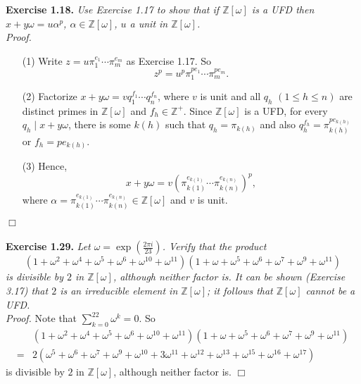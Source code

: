 \documentclass{article}
\begin{document}



\textbf{Exercise 1.18.}
\emph{Use Exercise 1.17 to show that if $\mathbb{Z}[\omega]$ is a UFD then
$x+y\omega = u\alpha^p$, $\alpha \in \mathbb{Z}[\omega]$,
$u$ a unit in $\mathbb{Z}[\omega]$. } \\

\emph{Proof.}
\begin{enumerate}
\item[(1)]
Write $z = u {\pi}_1^{e_1} \cdots {\pi}_m^{e_m}$ as Exercise 1.17.
So
$$z^p = u^p {\pi}_1^{pe_1} \cdots {\pi}_m^{pe_m}.$$
\item[(2)]
Factorize $x + y\omega = v q_1^{f_1} \cdots q_n^{f_n}$,
where $v$ is unit and all $q_h$ $(1 \leq h \leq n)$ are distinct primes in $\mathbb{Z}[\omega]$
and $f_h \in \mathbb{Z}^+$.
Since $\mathbb{Z}[\omega]$ is a UFD,
for every $q_h \mid x + y\omega$, there is some $k(h)$ such that $q_h = \pi_{k(h)}$
and also $q_h^{f_h} = \pi_{k(h)}^{pe_{k(h)}}$ or $f_h = pe_{k(h)}$.
\item[(3)]
Hence,
$$x + y\omega = v \left( \pi_{k(1)}^{e_{k(1)}} \cdots \pi_{k(n)}^{e_{k(n)}} \right)^p,$$
where $\alpha = \pi_{k(1)}^{e_{k(1)}} \cdots \pi_{k(n)}^{e_{k(n)}} \in \mathbb{Z}[\omega]$
and $v$ is unit.
\end{enumerate}
$\Box$ \\\\






\textbf{Exercise 1.29.}
\emph{Let $\omega = \exp(\frac{2\pi i}{23})$.
Verify that the product
$$(1+\omega^2+\omega^4+\omega^5+\omega^6+\omega^{10}+\omega^{11})
(1+\omega+\omega^5+\omega^6+\omega^7+\omega^9+\omega^{11})$$
is divisible by $2$ in $\mathbb{Z}[\omega]$,
although neither factor is.
It can be shown (Exercise 3.17) that $2$ is an irreducible element in $\mathbb{Z}[\omega]$;
it follows that $\mathbb{Z}[\omega]$ cannot be a UFD. } \\

\emph{Proof.}
Note that $\sum_{k=0}^{22} \omega^k = 0$.
So
\begin{align*}
&(1+\omega^2+\omega^4+\omega^5+\omega^6+\omega^{10}+\omega^{11})
(1+\omega+\omega^5+\omega^6+\omega^7+\omega^9+\omega^{11}) \\
=& 2(\omega^5+\omega^6+\omega^7+\omega^9+\omega^{10}+3\omega^{11}
+\omega^{12}+\omega^{13}+\omega^{15}+\omega^{16}+\omega^{17})
\end{align*}
is divisible by $2$ in $\mathbb{Z}[\omega]$,
although neither factor is.
$\Box$ \\\\
\end{document}
